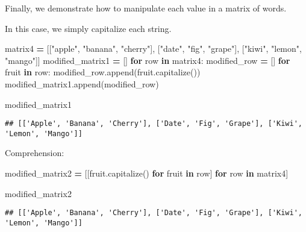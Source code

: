 \documentclass[
]{book}
\newenvironment{Shaded}{\begin{snugshade}}{\end{snugshade}}
\newcommand{\ControlFlowTok}[1]{\textcolor[rgb]{0.13,0.29,0.53}{\textbf{#1}}}
\newcommand{\KeywordTok}[1]{\textcolor[rgb]{0.13,0.29,0.53}{\textbf{#1}}}
\newcommand{\NormalTok}[1]{#1}
\newcommand{\OperatorTok}[1]{\textcolor[rgb]{0.81,0.36,0.00}{\textbf{#1}}}
\newcommand{\StringTok}[1]{\textcolor[rgb]{0.31,0.60,0.02}{#1}}
\begin{document}
Finally, we demonstrate how to manipulate each value in a matrix of words.

In this case, we simply capitalize each string.

\begin{Shaded}
\begin{Highlighting}[]
\NormalTok{matrix4 }\OperatorTok{=}\NormalTok{ [[}\StringTok{"apple"}\NormalTok{, }\StringTok{"banana"}\NormalTok{, }\StringTok{"cherry"}\NormalTok{],}
\NormalTok{        [}\StringTok{"date"}\NormalTok{, }\StringTok{"fig"}\NormalTok{, }\StringTok{"grape"}\NormalTok{],}
\NormalTok{        [}\StringTok{"kiwi"}\NormalTok{, }\StringTok{"lemon"}\NormalTok{, }\StringTok{"mango"}\NormalTok{]]}
\NormalTok{modified\_matrix1 }\OperatorTok{=}\NormalTok{ []}
\ControlFlowTok{for}\NormalTok{ row }\KeywordTok{in}\NormalTok{ matrix4:}
\NormalTok{    modified\_row }\OperatorTok{=}\NormalTok{ []}
    \ControlFlowTok{for}\NormalTok{ fruit }\KeywordTok{in}\NormalTok{ row:}
\NormalTok{        modified\_row.append(fruit.capitalize())}
\NormalTok{    modified\_matrix1.append(modified\_row)}
    
\NormalTok{modified\_matrix1}
\end{Highlighting}
\end{Shaded}

\begin{verbatim}
## [['Apple', 'Banana', 'Cherry'], ['Date', 'Fig', 'Grape'], ['Kiwi', 'Lemon', 'Mango']]
\end{verbatim}

Comprehension:

\begin{Shaded}
\begin{Highlighting}[]
\NormalTok{modified\_matrix2 }\OperatorTok{=}\NormalTok{ [[fruit.capitalize() }\ControlFlowTok{for}\NormalTok{ fruit }\KeywordTok{in}\NormalTok{ row] }\ControlFlowTok{for}\NormalTok{ row }\KeywordTok{in}\NormalTok{ matrix4]}

\NormalTok{modified\_matrix2}
\end{Highlighting}
\end{Shaded}

\begin{verbatim}
## [['Apple', 'Banana', 'Cherry'], ['Date', 'Fig', 'Grape'], ['Kiwi', 'Lemon', 'Mango']]
\end{verbatim}

  
\end{document}
